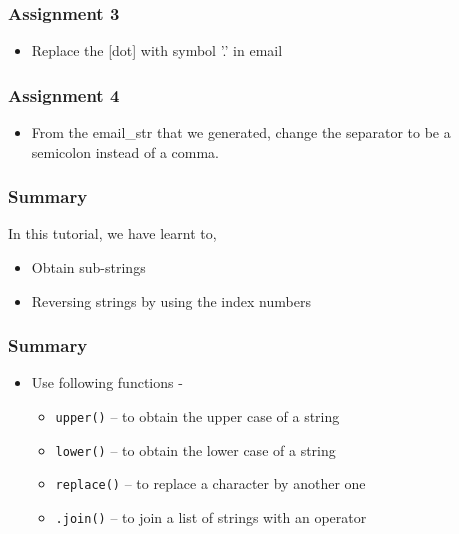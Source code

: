 \documentclass[17pt]{beamer}
\begin{document}
\begin{frame}
\frametitle{Assignment 3}
\label{sec-7}


\begin{itemize}
\item Replace the [dot] with symbol '.' in email
\end{itemize}
\end{frame}
\begin{frame}
\frametitle{Assignment 4}
\label{sec-8}


\begin{itemize}
\item From the email\_str that we generated, change the separator to be a semicolon instead of a comma.

\end{itemize}
\end{frame}
\begin{frame}
\frametitle{Summary}
\label{sec-9.1}

  In this tutorial, we have learnt to, 

\begin{itemize}
\item Obtain sub-strings\pause 
\item Reversing strings by using the index numbers
\end{itemize}
\end{frame}
\begin{frame}
\frametitle{Summary}
\label{sec-9.2}

\begin{itemize}
\item Use following functions -\pause
\begin{itemize}
\item \texttt{upper()} -- to obtain the upper case of a string\pause
\item \texttt{lower()} -- to obtain the lower case of a string\pause
\item \texttt{replace()} -- to replace a character by another one\pause
\item \texttt{.join()} -- to join a list of strings with an operator
\end{itemize}
\end{itemize}
\end{frame}
\end{document}
